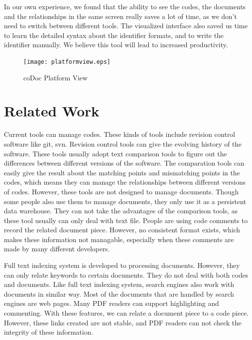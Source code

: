 \documentclass[11pt,letterpaper,oneside]{article}
\begin{document}
In our own experience, we found that the ability to see the codes, 
the documents and the relationships in the same screen really saves a lot of time,
as we don't need to switch between different tools.
The visualized interface also saved us time to learn the detailed syntax about the identifier formats,
and to write the identifier manually.
We believe this tool will lead to increased productivity.

\begin{figure}
\begin{center}
\texttt{[image: platformview.eps]}
\caption{coDoc Platform View}
\label{fig:platformview}
\end{center}
\end{figure}


\section{Related Work}
\label{sec:related}
Current tools can manage codes. 
These kinds of tools include revision control software like git, svn. 
Revision control tools can give the evolving history of the software.
These tools usually adopt text comparison tools to figure out the differences between different versions of the software.
The comparation tools can easily give the result about the matching points and mismatching points in the codes,
which means they can manage the relationships between different versions of codes.
However, these tools are not designed to manage documents.
Though some people also use them to manage documents,
they only use it as a persistent data warehouse.
They can not take the advantages of the comparison tools, 
as these tool usually can only deal with text file.
People are using code comments to record the related document piece.
However, no consistent format exists,
which makes these information not managable,
especially when these comments are made by many different developers.

Full text indexing system is developed to processing documents.
However, they can only relate keywords to certain documents.
They do not deal with both codes and documents. 
Like full text indexing system,
search engines also work with documents in similar way.
Most of the documents that are handled by search engines are web pages.
Many PDF readers can support highlighting and commenting.
With these features, we can relate a document piece to a code piece.
However, these links created are not stable,
and PDF readers can not check the integrity of these information.
\end{document}
